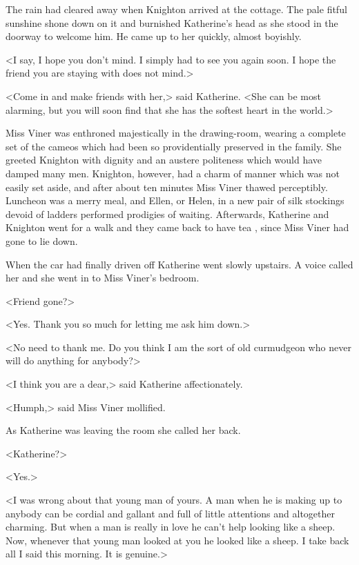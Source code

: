 The rain had cleared away when Knighton arrived at the cottage. The pale fitful sunshine shone down on it and burnished Katherine's head as she stood in the doorway to welcome him. He came up to her quickly, almost boyishly.

<I say, I hope you don't mind. I simply had to see you again soon. I hope the friend you are staying with does not mind.>

<Come in and make friends with her,> said Katherine. <She can be most alarming, but you will soon find that she has the softest heart in the world.>

Miss Viner was enthroned majestically in the drawing-room, wearing a complete set of the cameos which had been so providentially preserved in the family. She greeted Knighton with dignity and an austere politeness which would have damped many men. Knighton, however, had a charm of manner which was not easily set aside, and after about ten minutes Miss Viner thawed perceptibly. Luncheon was a merry meal, and Ellen, or Helen, in a new pair of silk stockings devoid of ladders performed prodigies of waiting. Afterwards, Katherine and Knighton went for a walk and they came back to have tea , since Miss Viner had gone to lie down.

When the car had finally driven off Katherine went slowly upstairs. A voice called her and she went in to Miss Viner's bedroom.

<Friend gone?>

<Yes. Thank you so much for letting me ask him down.>

<No need to thank me. Do you think I am the sort of old curmudgeon who never will do anything for anybody?>

<I think you are a dear,> said Katherine affectionately.

<Humph,> said Miss Viner mollified.

As Katherine was leaving the room she called her back.

<Katherine?>

<Yes.>

<I was wrong about that young man of yours. A man when he is making up to anybody can be cordial and gallant and full of little attentions and altogether charming. But when a man is really in love he can't help looking like a sheep. Now, whenever that young man looked at you he looked like a sheep. I take back all I said this morning. It is genuine.>